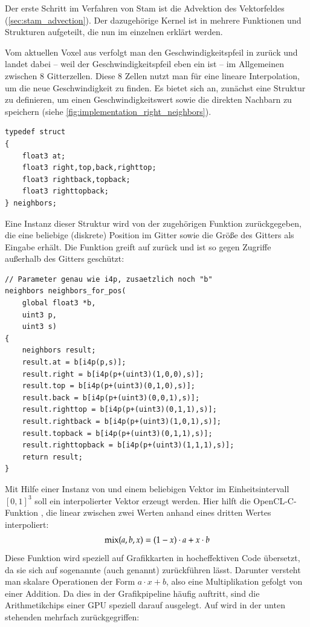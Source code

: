 Der erste Schritt im Verfahren von Stam ist die Advektion des
Vektorfeldes 
(\Pimiddyvgl \autoref{sec:stam_advection}). Der dazugehörige Kernel ist in
mehrere Funktionen und Strukturen aufgeteilt, die nun im einzelnen
erklärt werden.

Vom aktuellen Voxel aus verfolgt man den Geschwindigkeitspfeil in
 zurück und landet dabei -- weil der
Geschwindigkeitspfeil eben ein  ist -- im
Allgemeinen zwischen 8 Gitterzellen. Diese 8 Zellen nutzt man für eine
lineare Interpolation, um die neue Geschwindigkeit zu finden. Es
bietet sich an, zunächst eine Struktur zu definieren, um einen
Geschwindigkeitswert sowie die direkten Nachbarn zu speichern (siehe
\autoref{fig:implementation_right_neighbors}).

\begin{verbatim}
typedef struct
{
    float3 at;
    float3 right,top,back,righttop;
    float3 rightback,topback;
    float3 righttopback;
} neighbors;
\end{verbatim}

Eine Instanz dieser Struktur wird von der zugehörigen Funktion
 zurückgegeben, die eine
beliebige (diskrete) Position im Gitter sowie die Größe des Gitters
als Eingabe erhält. Die Funktion greift auf 
zurück und ist so gegen Zugriffe außerhalb des Gitters geschützt:

\begin{verbatim}
// Parameter genau wie i4p, zusaetzlich noch "b"
neighbors neighbors_for_pos(
    global float3 *b,
    uint3 p,
    uint3 s)
{
    neighbors result;
    result.at = b[i4p(p,s)];
    result.right = b[i4p(p+(uint3)(1,0,0),s)];
    result.top = b[i4p(p+(uint3)(0,1,0),s)];
    result.back = b[i4p(p+(uint3)(0,0,1),s)];
    result.righttop = b[i4p(p+(uint3)(0,1,1),s)];
    result.rightback = b[i4p(p+(uint3)(1,0,1),s)];
    result.topback = b[i4p(p+(uint3)(0,1,1),s)];
    result.righttopback = b[i4p(p+(uint3)(1,1,1),s)];
    return result;
}
\end{verbatim}

Mit Hilfe einer Instanz von  und einem
beliebigen Vektor im Einheitsintervall $[0,1]^3$ soll ein
interpolierter Vektor erzeugt werden. Hier hilft die OpenCL-C-Funktion
, die linear zwischen zwei Werten anhand eines
dritten Wertes interpoliert:
\begin{align}
\textnormal{mix}(a,b,x) = (1-x)\cdot a + x \cdot b
\end{align}
Diese Funktion wird speziell auf Grafikkarten in hocheffektiven Code
übersetzt, da sie sich auf sogenannte
 (auch
 genannt) zurückführen lässt. Darunter versteht man
skalare Operationen der Form $a\cdot x + b$, also eine Multiplikation
gefolgt von einer Addition. Da dies in der Grafikpipeline häufig
auftritt, sind die Arithmetikchips einer GPU speziell darauf
ausgelegt. Auf  wird in der unten stehenden
 mehrfach zurückgegriffen:

